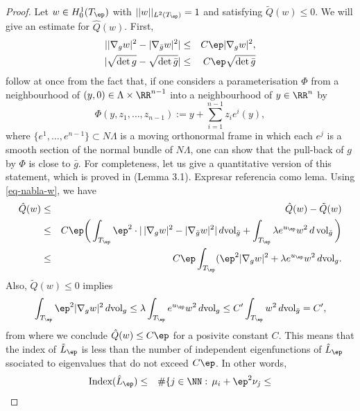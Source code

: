 \begin{proof} Let $w\in H_0^1(T_\ep)$ with $||w||_{L^2(T_\ep)}=1$ and
    satisfying $\tilde Q(w)\leq 0$. We will give an estimate for $\hat Q(w)$.
    First,
    \begin{eqnarray}
        \label{eq-nabla-w}
        ||\nabla_g w|^2-|\nabla_{\bar g} w|^2|&\leq& C\ep |\nabla_g w|^2,\\
        |\sqrt{\det g} - \sqrt{\det \bar g}|&\leq& C\ep\sqrt{\det \bar g}
    \end{eqnarray}
    follow at once from the fact that, if one considers a parameterisation $\Phi$
    from a neighbourhood of $(y,0)\in \Lambda\times \RR^{n-1}$ into a
    neighbourhood of $y\in\RR^n$ by
    $$
    \Phi(y,z_1,\dots,z_{n-1}):=y + \sum_{i=1}^{n-1}z_i e^i(y),
    $$
    where $\{e^1,\dots, e^{n-1}\}\subset N\Lambda$ is a moving orthonormal
    frame in which each $e^j$ is a smooth section of the normal bundle of
    $N\Lambda$, one can show that the pull-back of $g$ by $\Phi$ is close
    to $\bar g$. For completeness, let us give a quantitative version of this
    statement, which is proved in \cite{Pacard2014} (Lemma 3.1). {\color{red}
    Expresar referencia como lema.} Using \ref{eq-nabla-w}, we have
    \begin{eqnarray*}
        \hat Q(w) &\leq & \hat Q(w)-\tilde Q(w)\\
                  &\leq & C\ep\bigg(\int_{T_\ep} \ep^2 \cdot |\, |\nabla_g
                      w|^2-|\nabla_{\bar g} w|^2|\, d\mbox{vol}_{\bar g}
                      + \int_{T_\ep} \lambda e^{u_\ep}w^2\,
                  d\operatorname{vol}_{\bar g}\bigg)\\
                  &\leq & C\ep\int_{T_\ep}(\ep^2|\nabla_g w|^2+\lambda
                  e^{u_\ep}w^2 \, d\mbox{vol}_g.
    \end{eqnarray*}
    Also, $\tilde Q(w)\leq 0$ implies
    \begin{equation}
        \int_{T_{\ep}} \ep^2|\nabla_g w|^2\, d\mbox{vol}_g \leq \lambda
        \int_{T_\ep}e^{u_\ep}w^2\, d\mbox{vol}_g \leq C'\int_{T_\ep}w^2\,
        d\mbox{vol}_{\bar g}=C',
    \end{equation}
    from where we conclude $\hat Q(w)\leq C\ep$ for a posivite constant $C$.
    This means that the index of $\tilde L_\ep$ is less than the number of
    independent eigenfunctions of $\hat L_\ep$ ssociated to eigenvalues that
    do not exceed $C\ep$. In other words,
    \begin{eqnarray*}
        \mbox{Index}(\hat L_\ep) &\leq & \#\{j\in\NN:\, \mu_i+\ep^2\nu_j\leq

\end{eqnarray*}
\end{proof}
